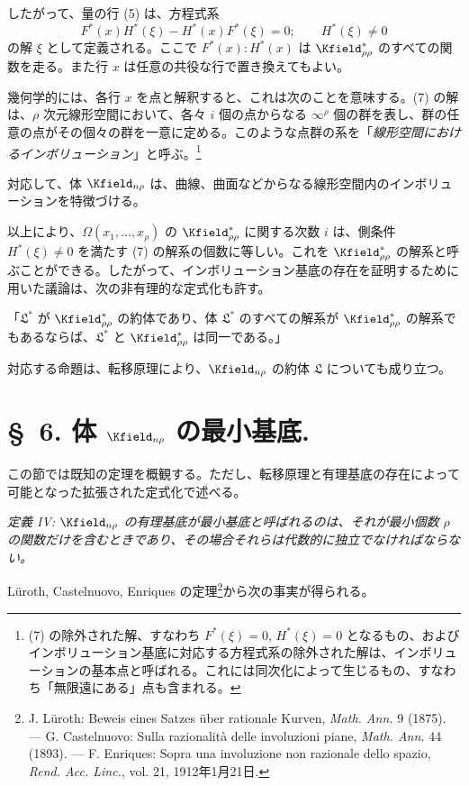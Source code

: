\documentclass[11pt]{article}
\begin{document}
したがって、量の行 (5) は、方程式系
\[
  F^*(x)H^*(\xi)-H^*(x)F^*(\xi)=0;
  \qquad H^*(\xi)\ne0
\]
の解 $\xi$ として定義される。ここで $F^*(x):H^*(x)$ は $\Kfield^*_{\rho\rho}$ のすべての関数を走る。また行 $x$ は任意の共役な行で置き換えてもよい。

幾何学的には、各行 $x$ を点と解釈すると、これは次のことを意味する。(7) の解は、$\rho$ 次元線形空間において、各々 $i$ 個の点からなる $\infty^\rho$ 個の群を表し、群の任意の点がその個々の群を一意に定める。このような点群の系を「\emph{線形空間におけるインボリューション}」と呼ぶ。\footnote{(7) の除外された解、すなわち $F^*(\xi)=0$, $H^*(\xi)=0$ となるもの、およびインボリューション基底に対応する方程式系の除外された解は、インボリューションの基本点と呼ばれる。これには同次化によって生じるもの、すなわち「無限遠にある」点も含まれる。}

対応して、体 $\Kfield_{n\rho}$ は、曲線、曲面などからなる線形空間内のインボリューションを特徴づける。

以上により、$\Omega(x_1,\ldots,x_\rho)$ の $\Kfield^*_{\rho\rho}$ に関する次数 $i$ は、側条件 $H^*(\xi)\ne0$ を満たす (7) の解系の個数に等しい。これを $\Kfield^*_{\rho\rho}$ の解系と呼ぶことができる。したがって、インボリューション基底の存在を証明するために用いた議論は、次の非有理的な定式化も許す。

「$\mathfrak{L}^*$ が $\Kfield^*_{\rho\rho}$ の約体であり、体 $\mathfrak{L}^*$ のすべての解系が $\Kfield^*_{\rho\rho}$ の解系でもあるならば、$\mathfrak{L}^*$ と $\Kfield^*_{\rho\rho}$ は同一である。」

対応する命題は、転移原理により、$\Kfield_{n\rho}$ の約体 $\mathfrak{L}$ についても成り立つ。

\section*{\S\ 6. 体 $\Kfield_{n\rho}$ の最小基底.}

この節では既知の定理を概観する。ただし、転移原理と有理基底の存在によって可能となった拡張された定式化で述べる。

\emph{定義 IV: $\Kfield_{n\rho}$ の有理基底が最小基底と呼ばれるのは、それが最小個数 $\rho$ の関数だけを含むときであり、その場合それらは代数的に独立でなければならない。}

Lüroth, Castelnuovo, Enriques の定理\footnote{J. Lüroth: Beweis eines Satzes über rationale Kurven, \emph{Math. Ann.} 9 (1875). --- G. Castelnuovo: Sulla razionalità delle involuzioni piane, \emph{Math. Ann.} 44 (1893). --- F. Enriques: Sopra una involuzione non razionale dello spazio, \emph{Rend. Acc. Linc.}, vol. 21, 1912年1月21日.}から次の事実が得られる。
\end{document}
